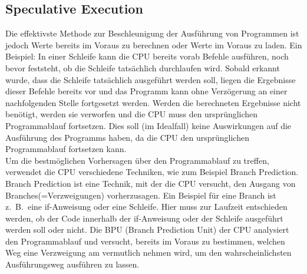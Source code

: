 \subsection{Speculative Execution}
\label{subsec:speculative-execution}

Die effektivste Methode zur Beschleunigung der Ausführung von Programmen ist jedoch Werte bereits im Voraus zu berechnen oder Werte im Voraus zu laden.
Ein Beispiel: In einer Schleife kann die CPU bereits vorab Befehle ausführen, noch bevor feststeht, ob die Schleife tatsächlich durchlaufen wird.
Sobald erkannt wurde, dass die Schleife tatsächlich ausgeführt werden soll, liegen die Ergebnisse dieser Befehle bereits vor und das Programm kann ohne Verzögerung an einer nachfolgenden Stelle fortgesetzt werden.
Werden die berechneten Ergebnisse nicht benötigt, werden sie verworfen und die CPU muss den ursprünglichen Programmablauf fortsetzen.
Dies soll (im Idealfall) keine Auswirkungen auf die Ausführung des Programms haben, da die CPU den ursprünglichen Programmablauf fortsetzen kann. \\
Um die bestmöglichen Vorhersagen über den Programmablauf zu treffen, verwendet die CPU verschiedene Techniken, wie zum Beispiel Branch Prediction.
Branch Prediction ist eine Technik, mit der die CPU versucht, den Ausgang von Branches(=Verzweigungen) vorherzusagen.
Ein Beispiel für eine Branch ist z.~B.~eine if-Anweisung oder eine Schleife.
Hier muss zur Laufzeit entschieden werden, ob der Code innerhalb der if-Anweisung oder der Schleife ausgeführt werden soll oder nicht.
Die BPU (Branch Prediction Unit) der CPU analysiert den Programmablauf und versucht, bereits im Voraus zu bestimmen, welchen Weg eine Verzweigung am vermutlich nehmen wird, um den wahrscheinlichsten Ausführungsweg ausführen zu lassen.